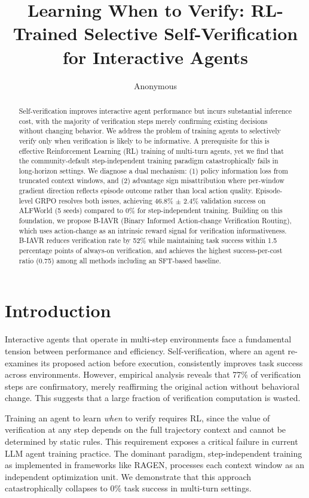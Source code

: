 \documentclass[11pt]{article}
\title{Learning When to Verify: RL-Trained Selective Self-Verification for Interactive Agents}
\author{Anonymous}
\date{}
\begin{document}
\maketitle

\begin{abstract}
Self-verification improves interactive agent performance but incurs substantial inference cost, with the majority of verification steps merely confirming existing decisions without changing behavior. We address the problem of training agents to selectively verify only when verification is likely to be informative. A prerequisite for this is effective Reinforcement Learning (RL) training of multi-turn agents, yet we find that the community-default step-independent training paradigm catastrophically fails in long-horizon settings. We diagnose a dual mechanism: (1) policy information loss from truncated context windows, and (2) advantage sign misattribution where per-window gradient direction reflects episode outcome rather than local action quality. Episode-level GRPO resolves both issues, achieving 46.8\% $\pm$ 2.4\% validation success on ALFWorld (5 seeds) compared to 0\% for step-independent training. Building on this foundation, we propose B-IAVR (Binary Informed Action-change Verification Routing), which uses action-change as an intrinsic reward signal for verification informativeness. B-IAVR reduces verification rate by 52\% while maintaining task success within 1.5 percentage points of always-on verification, and achieves the highest success-per-cost ratio (0.75) among all methods including an SFT-based baseline.
\end{abstract}

\section{Introduction}

Interactive agents that operate in multi-step environments face a fundamental tension between performance and efficiency. Self-verification, where an agent re-examines its proposed action before execution, consistently improves task success across environments. However, empirical analysis reveals that 77\% of verification steps are confirmatory, merely reaffirming the original action without behavioral change. This suggests that a large fraction of verification computation is wasted.

Training an agent to learn \emph{when} to verify requires RL, since the value of verification at any step depends on the full trajectory context and cannot be determined by static rules. This requirement exposes a critical failure in current LLM agent training practice. The dominant paradigm, step-independent training as implemented in frameworks like RAGEN, processes each context window as an independent optimization unit. We demonstrate that this approach catastrophically collapses to 0\% task success in multi-turn settings.
\end{document}
